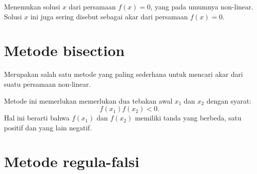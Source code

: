 \documentclass[a4paper]{article}
\begin{document}
Menemukan solusi $x$ dari persamaan $f(x) = 0$, yang pada umumnya non-linear.
Solusi $x$ ini juga sering disebut sebagai akar dari persamaan $f(x) = 0$.

\section{Metode bisection}

Merupakan salah satu metode yang paling sederhana untuk mencari akar
dari suatu persamaan non-linear.

Metode ini memerlukan memerlukan dua tebakan awal $x_{1}$ dan $x_{2}$
dengan syarat:
\begin{equation}
f(x_1)f(x_2) < 0.
\end{equation}
Hal ini berarti bahwa $f(x_1)$ dan $f(x_2)$ memiliki tanda yang berbeda, satu positif
dan yang lain negatif.



\section{Metode regula-falsi}
\end{document}
